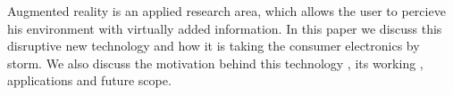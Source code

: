 Augmented reality is an applied research area, which allows the user
to percieve his environment with virtually added information.
In this paper we discuss this disruptive new technology and how it is
taking the consumer electronics by storm. 
We also discuss the motivation behind this technology , its working ,
applications and future scope.
